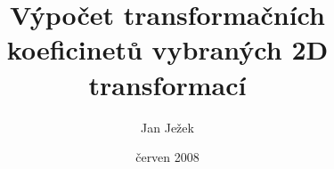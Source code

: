 \documentclass[a4paper,10pt,openany,oneside,notitlepage]{article}
\begin{document}
\title{\bf{Výpočet transformačních
koeficinetů vybraných 2D transformací}}

\author{Jan Ježek}

\date{červen 2008}

\maketitle

\vspace{35 pt}

\tableofcontents


	
		
		
        
\end{document}

